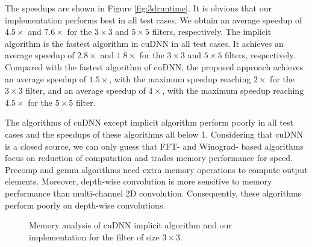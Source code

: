 The speedups are shown in Figure \ref{fig:3druntime}. It is obvious that our implementation performs best in all test cases. We obtain an average speedup of $4.5\times$ and $7.6\times$ for the $3 \times 3$ and $5 \times 5$ filters, respectively. The implicit algorithm is the fastest algorithm in cuDNN in all test cases. It achieves an average speedup of $2.8\times$ and $1.8\times$ for the $3 \times 3$ and $5 \times 5$ filters, respectively. Compared with the fastest algorithm of cuDNN, the proposed approach achieves an average speedup of $1.5\times$, with the maximum speedup reaching $2\times$ for the $3 \times 3$ filter, and an average speedup of $4\times$, with the maximum speedup reaching $4.5\times$ for the $5 \times 5$ filter.

The algorithms of cuDNN except implicit algorithm perform poorly in all test cases and the speedups of these algorithms all below 1. Considering that cuDNN is a closed source, we can only guess that FFT- and Winograd- based algorithms focus on reduction of computation and trades memory performance for speed. Precomp and gemm algorithms need extra memory operations to compute output elements. Moreover, depth-wise convolution is more sensitive to memory performance than multi-channel 2D convolution. Consequently, these algorithms perform poorly on depth-wise convolutions.
 
\begin{figure}
\centering

\hspace{0em}
	
\caption{Memory analysis of cuDNN implicit algorithm and our implementation for the filter of size $3 \times 3$.}
\label{fig:depwisememanaly}
\end{figure}

